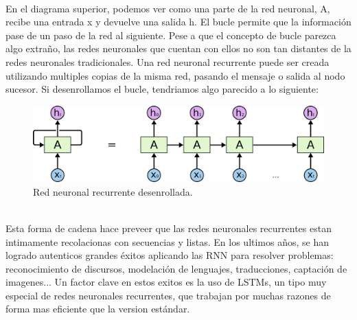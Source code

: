 \\En el diagrama superior, podemos ver como una parte de la red neuronal, A, recibe una entrada x y devuelve una salida h. El bucle permite que la información pase de un paso de la red al siguiente. Pese a que el concepto de bucle parezca algo extraño, las redes neuronales que cuentan con ellos no son tan distantes de la redes neuronales tradicionales. Una red neuronal recurrente puede ser creada utilizando multiples copias de la misma red, pasando el mensaje o salida al nodo sucesor. Si desenrollamos el bucle, tendriamos algo parecido a lo siguiente:\\
\begin{figure}[htp]
\centering
\vspace{-1.5em}
\includegraphics[scale=0.3]{images/RNNunrolled.png}
\caption{Red neuronal recurrente desenrollada.}
\end{figure}
\\Esta forma de cadena hace preveer que las redes neuronales recurrentes estan intimamente recolacionas con secuencias y listas. En los ultimos años, se han logrado autenticos grandes éxitos aplicando las RNN para resolver problemas: reconocimiento de discursos, modelación de lenguajes, traducciones, captación de imagenes... Un factor clave en estos exitos es la uso de LSTMs, un tipo muy especial de redes neuronales recurrentes, que trabajan por muchas razones de forma mas eficiente que la version estándar.
